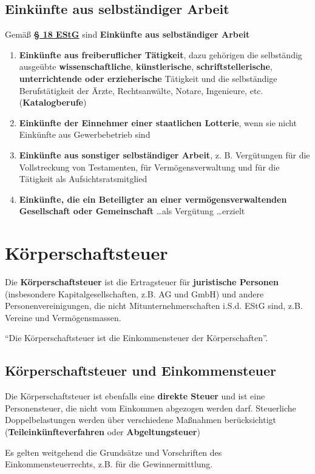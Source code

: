 \documentclass[12pt,A4]{extarticle}
\newcommand{\highlight}[1]{\textcolor{highlightColor}{\textbf{#1}}}
\newcommand{\estG}[2][]{\textbf{\textcolor{gesetzLink}{\href{https://www.gesetze-im-internet.de/estg/__#2.html}{§ #2 \ifthenelse{\equal{#1}{}}{}{#1 }EStG}}}}
\begin{document}
\subsection{Einkünfte aus selbständiger Arbeit}
Gemäß \estG[Abs. 1]{18} sind \highlight{Einkünfte aus selbständiger Arbeit}
\begin{enumerate}
  \item{\textbf{Einkünfte aus freiberuflicher Tätigkeit}, dazu gehörigen die selbständig ausgeübte \textbf{wissenschaftliche}, \textbf{künstlerische}, \textbf{schriftstellerische}, \textbf{unterrichtende oder erzieherische} Tätigkeit und die selbständige Berufstätigkeit der Ärzte, Rechtsanwälte, Notare, Ingenieure, etc. (\highlight{Katalogberufe})}
  \item{\textbf{Einkünfte der Einnehmer einer staatlichen Lotterie}, wenn sie nicht Einkünfte aus Gewerbebetrieb sind}
  \item{\textbf{Einkünfte aus sonstiger selbständiger Arbeit}, z. B. Vergütungen für die Vollstreckung von Testamenten, für Vermögensverwaltung und für die Tätigkeit als Aufsichtsratsmitglied}
  \item{\textbf{Einkünfte, die ein Beteiligter an einer vermögensverwaltenden Gesellschaft oder Gemeinschaft} \dots als Vergütung \dots erzielt}
\end{enumerate}

\section{Körperschaftsteuer}
Die \highlight{Körperschaftsteuer} ist die Ertragsteuer für \textbf{juristische Personen} (insbesondere Kapitalgesellschaften, z.B. AG und GmbH) und andere Personenvereinigungen, die nicht Mitunternehmerschaften i.S.d. EStG sind, z.B. Vereine und Vermögensmassen.\par
``Die Körperschaftsteuer ist die Einkommensteuer der Körperschaften''.

\subsection{Körperschaftsteuer und Einkommensteuer}
Die Körperschaftsteuer ist ebenfalls eine \textbf{direkte Steuer} und ist eine Personensteuer, die nicht vom Einkommen abgezogen werden darf. Steuerliche Doppelbelastungen werden über verschiedene Maßnahmen berücksichtigt (\textbf{Teileinkünfteverfahren} oder \textbf{Abgeltungsteuer}) \par
Es gelten weitgehend die Grundsätze und Vorschriften des Einkommensteuerrechts, z.B. für die Gewinnermittlung.
\end{document}

